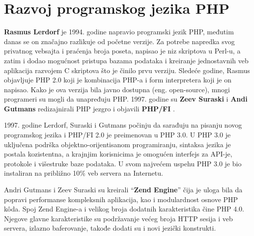 \documentclass[a4paper]{article}
\begin{document}
{%



\section{Razvoj programskog jezika PHP}
\textbf{Rasmus Lerdorf} je 1994. godine napravio programski jezik PHP\cite{php}, međutim danas se on značajno razlikuje od početne verzije. Za potrebe napredka svog privatnog vebsajta i praćenja broja poseta, napisao je niz skriptova u Perl-u, a zatim i dodao mogućnost pristupa bazama podataka i kreiranje jednostavnih veb aplikacija razvojem C skriptova što je činilo prvu verziju. Sledeće godine, Rasmus objavljuje PHP 2.0 koji je kombinacija PHP-a i form interpretera koji je on napisao. Kako je ova verzija bila javno dostupna (eng. open-source), mnogi programeri su mogli da unapređuju PHP. 1997. godine su \textbf{Zeev Suraski} i \textbf{Andi Gutmans} redizajnirali PHP jezgro i objavili \textbf{PHP/FI} \cite{phpfi}.

1997. godine Lerdorf, Suraski i Gutmans počinju da sarađuju na pisanju novog programskog jezika i PHP/FI 2.0 je preimenovan u PHP 3.0. U PHP 3.0 je uključena podrška objektno-orijentisanom programiranju, sintaksa jezika je postala kozistentna, a krajnjim korisnicima je omogućen interfejs za API-je, protokole i višestruke baze podataka. U svom najvećem uspehu PHP 3.0 je bio instaliran na približno 10\% veb servera na Internetu\cite{php}.


Andri Gutmans i Zeev Suraski su kreirali “\textbf{Zend Engine}” \cite{zend} čija je uloga bila da popravi performanse kompleksnih aplikacija, kao i modulardnost osnove PHP k\^{o}da. Spoj Zend Engine-a i velikog broja dodatnih karakteristika čine PHP 4.0. Njegove glavne karakteristike su podržavanje većeg broja HTTP sesija i veb servera, izlazno baferovanje, takođe dodati su i novi jezički konstrukti.

}
\end{document}

